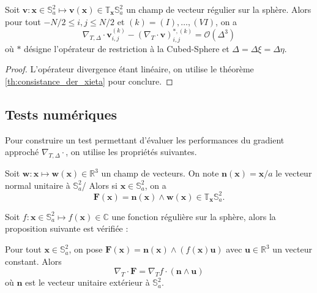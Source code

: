 \begin{proposition}
Soit $\mathbf{v} : \mathbf{x} \in \mathbb{S}_a^2 \mapsto \mathbf{v}(\mathbf{x}) \in \mathbb{T}_{\mathbf{x}} \mathbb{S}_a^2$ un champ de vecteur régulier sur la sphère. Alors pour tout $-N/2 \leq i,j \leq N/2$ et $(k) = (I) , \ldots , (VI)$, on a 
\begin{equation}
\nabla_{T,\Delta} \cdot \mathbf{v}_{i,j}^{(k)} - (\nabla_{T} \cdot \mathbf{v} )_{i,j}^{*,(k)} = \mathcal{O} \left( \Delta^3 \right)
\end{equation}
où $*$ désigne l'opérateur de restriction à la Cubed-Sphere et $\Delta  = \Delta \xi = \Delta \eta$.
\label{prop:accuracy_divergence}
\end{proposition}

\begin{proof}
L'opérateur divergence étant linéaire, on utilise le théorème \ref{th:consistance_der_xieta} pour conclure.
\end{proof}

\subsection{Tests numériques}

Pour construire un test permettant d'évaluer les performances du gradient approché $\nabla_{T, \Delta} \cdot$, on utilise les propriétés suivantes.

\begin{lemme}
\label{lem:n_vect_w}
Soit $\mathbf{w} : \mathbf{x} \mapsto \mathbf{w}(\mathbf{x}) \in \mathbb{R}^3$ un champ de vecteurs. On note $ \mathbf{n}(\mathbf{x}) = \mathbf{x}/a$ le vecteur normal unitaire à $\mathbb{S}_a^2$/ Alors si $\mathbf{x} \in \mathbb{S}_a^2$, on a
\begin{equation}
\mathbf{F}(\mathbf{x}) = \mathbf{n}(\mathbf{x}) \wedge \mathbf{w}(\mathbf{x}) \in \mathbb{T}_{\mathbf{x}} \mathbb{S}_a^2.
\end{equation}
\end{lemme}

Soit $f : \mathbf{x} \in \mathbb{S}^2_a \mapsto f(\mathbf{x}) \in \mathbb{C}$ une fonction régulière sur la sphère, alors la proposition suivante est vérifiée :

\begin{proposition}
Pour tout $\mathbf{x} \in \mathbb{S}_a^2$, 
on pose $\mathbf{F}(\mathbf{x}) = \mathbf{n}(\mathbf{x}) \wedge (f (\mathbf{x}) \mathbf{u})$ 
avec $\mathbf{u} \in \mathbb{R}^3$ un vecteur constant. Alors
\begin{equation}
\nabla_T \cdot \mathbf{F} = \nabla_T f \cdot \left( \mathbf{n} \wedge \mathbf{u} \right)
\end{equation}
où $\mathbf{n}$ est le vecteur unitaire extérieur à $\mathbb{S}_a^2$.
\label{prop:grad-div_link}
\end{proposition}

